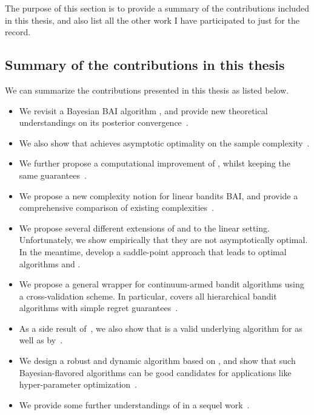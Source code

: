 The purpose of this section is to provide a summary of the contributions included in this thesis, and also list all the other work I have participated to just for the record.

\subsection{Summary of the contributions in this thesis}\label{sec:intro.contributions.summary}

We can summarize the contributions presented in this thesis as listed below.

\begin{itemize}[label=]
    \item We revisit a Bayesian BAI algorithm \TTTS, and provide new theoretical understandings on its posterior convergence~\citep{shang2020t3c}.
    \item We also show that \TTTS achieves asymptotic optimality on the sample complexity~\citep{shang2020t3c}.
    \item We further propose a computational improvement \TCC of \TTTS, whilst keeping the same guarantees~\citep{shang2020t3c}.
    \item We propose a new complexity notion for linear bandits BAI, and provide a comprehensive comparison of existing complexities~\citep{degenne2020game}.
    \item We propose several different extensions of \TTTS and \TCC to the linear setting. Unfortunately, we show empirically that they are not asymptotically optimal. In the meantime, \cite{degenne2020game} develop a saddle-point approach that leads to optimal algorithms \LG and \LGC.
    \item We propose a general wrapper \GPO for continuum-armed bandit algorithms using a cross-validation scheme. In particular, \GPO covers all hierarchical bandit algorithms with simple regret guarantees~\citep{shang2019adaptive}.
    \item As a side result of~\cite{shang2019adaptive}, we also show that \HCT is a valid underlying algorithm for \GPO as well as \POO by~\cite{grill2015poo}.
    \item We design a robust and dynamic algorithm \DTTTS based on \TTTS, and show that such Bayesian-flavored algorithms can be good candidates for applications like hyper-parameter optimization~\citep{shang2019dttts}.
    \item We provide some further understandings of \DTTTS in a sequel work~\citep{shang2020dttts}.
\end{itemize}


